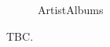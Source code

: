 \documentclass{article}
\begin{document}
\begin{figure}[H]
	\noindent
	\caption{ArtistAlbums} 
\end{figure}

TBC.
\end{document}
